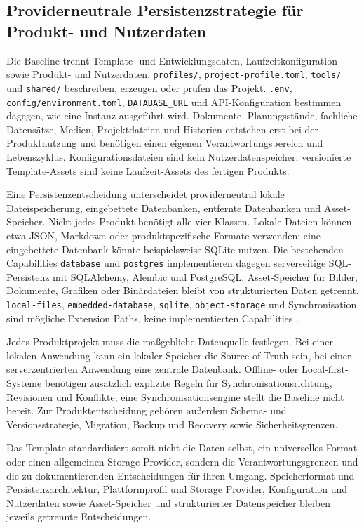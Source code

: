 \subsection{Providerneutrale Persistenzstrategie für Produkt- und Nutzerdaten}
\label{subsec:providerneutrale-persistenzstrategie}

Die Baseline trennt Template- und Entwicklungsdaten, Laufzeitkonfiguration
sowie Produkt- und Nutzerdaten. \texttt{profiles/},
\texttt{project-profile.toml}, \texttt{tools/} und \texttt{shared/}
beschreiben, erzeugen oder prüfen das Projekt. \texttt{.env},
\texttt{config/environment.toml}, \texttt{DATABASE\_URL} und
API-Konfiguration bestimmen dagegen, wie eine Instanz ausgeführt wird.
Dokumente, Planungsstände, fachliche Datensätze, Medien, Projektdateien und
Historien entstehen erst bei der Produktnutzung und benötigen einen eigenen
Verantwortungsbereich und Lebenszyklus. Konfigurationsdateien sind kein
Nutzerdatenspeicher; versionierte Template-Assets sind keine Laufzeit-Assets
des fertigen Produkts.

Eine Persistenzentscheidung unterscheidet providerneutral lokale
Dateispeicherung, eingebettete Datenbanken, entfernte Datenbanken und
Asset-Speicher. Nicht jedes Produkt benötigt alle vier Klassen. Lokale Dateien
können etwa JSON, Markdown oder produktspezifische Formate verwenden; eine
eingebettete Datenbank könnte beispielsweise SQLite nutzen. Die bestehenden
Capabilities \texttt{database} und \texttt{postgres} implementieren dagegen
serverseitige SQL-Persistenz mit SQLAlchemy, Alembic und PostgreSQL.
Asset-Speicher für Bilder, Dokumente, Grafiken oder Binärdateien bleibt von
strukturierten Daten getrennt. \texttt{local-files},
\texttt{embedded-database}, \texttt{sqlite}, \texttt{object-storage} und
Synchronisation sind mögliche Extension Paths, keine implementierten
Capabilities \parencite{kleiveist2026persistence}.

Jedes Produktprojekt muss die maßgebliche Datenquelle festlegen. Bei einer
lokalen Anwendung kann ein lokaler Speicher die Source of Truth sein, bei
einer serverzentrierten Anwendung eine zentrale Datenbank. Offline- oder
Local-first-Systeme benötigen zusätzlich explizite Regeln für
Synchronisationsrichtung, Revisionen und Konflikte; eine
Synchronisationsengine stellt die Baseline nicht bereit. Zur
Produktentscheidung gehören außerdem Schema- und Versionsstrategie,
Migration, Backup und Recovery sowie Sicherheitsgrenzen.

Das Template standardisiert somit nicht die Daten selbst, ein universelles
Format oder einen allgemeinen Storage Provider, sondern die
Verantwortungsgrenzen und die zu dokumentierenden Entscheidungen für ihren
Umgang. Speicherformat und Persistenzarchitektur, Plattformprofil und Storage
Provider, Konfiguration und Nutzerdaten sowie Asset-Speicher und strukturierter
Datenspeicher bleiben jeweils getrennte Entscheidungen.
